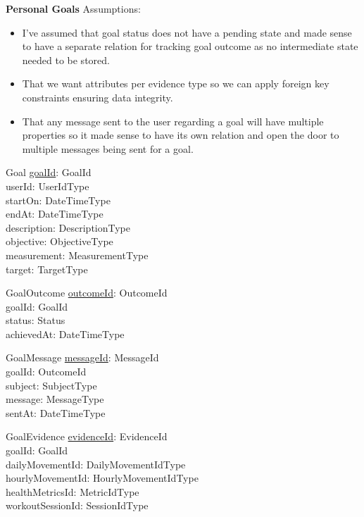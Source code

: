 \documentclass{article}
\begin{document}
\newline
\textbf{Personal Goals}
\newline \newline Assumptions:
\begin{itemize}
  \item I've assumed that goal status does not have a pending state and made sense to have a separate relation for tracking goal outcome as no intermediate state needed to be stored. 
  \item That we want attributes per evidence type so we can apply foreign key constraints ensuring data integrity.
  \item That any message sent to the user regarding a goal will have multiple properties so it made sense to have its own relation and open the door to multiple messages being sent for a goal.
\end{itemize}
\begin{schema}{Goal}
	\underline{goalId}: GoalId \\
    userId: UserIdType \\
    startOn: DateTimeType \\
    endAt: DateTimeType \\ 
    description: DescriptionType \\
    objective: ObjectiveType \\
    measurement: MeasurementType \\
    target: TargetType \\ 
\end{schema}
\vspace{-0.75cm}
\begin{schema}{GoalOutcome}
	\underline{outcomeId}: OutcomeId \\
    goalId: GoalId \\
    status: Status \\
    achievedAt: DateTimeType \\
\end{schema}
\vspace{-0.75cm}
\begin{schema}{GoalMessage}
	\underline{messageId}: MessageId \\
    goalId: OutcomeId \\
    subject: SubjectType \\
    message: MessageType \\
    sentAt: DateTimeType \\
\end{schema}
\vspace{-0.75cm}
\begin{schema}{GoalEvidence}
	\underline{evidenceId}: EvidenceId \\
    goalId: GoalId \\
    dailyMovementId: DailyMovementIdType \\
    hourlyMovementId: HourlyMovementIdType \\
    healthMetricsId: MetricIdType \\
    workoutSessionId: SessionIdType \\
\end{schema}
\end{document}
